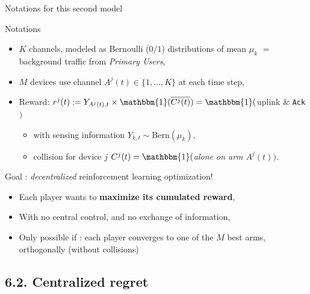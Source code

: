 \documentclass[12pt,english,ignorenonframetext,aspectratio=169,]{beamer}
\providecommand{\tightlist}{%
  \setlength{\itemsep}{0pt}\setlength{\parskip}{0pt}}
\begin{document}
\begin{frame}[fragile]{Notations for this second model}

\begin{block}{Notations}

\begin{itemize}
\tightlist
\item
  \(K\) channels, modeled as Bernoulli (\(0/1\)) distributions of mean
  \(\mu_k\) \(=\) background traffic from \emph{Primary Users},
\item
  \(M\) devices use channel \(A^j(t) \in \{1,\dots,K\}\) at each time
  step,
\item
  Reward:
  \(r^j(t) := Y_{A^j(t),t} \times \mathbbm{1}(\overline{C^j(t)}) = \mathbbm{1}(\)uplink
  \& \texttt{Ack}\()\)

  \begin{itemize}
  \tightlist
  \item
    with sensing information \(Y_{k,t} \sim \mathrm{Bern}(\mu_k)\),
  \item
    collision for device \(j\)
    \(C^j(t) = \mathbbm{1}(\)\emph{alone on arm $A^j(t)$}\()\).
  \end{itemize}
\end{itemize}

\pause

\end{block}

\begin{block}{Goal : \emph{decentralized} reinforcement learning
optimization!}

\begin{itemize}
\tightlist
\item
  Each player wants to \textbf{maximize its cumulated reward},
\item
  With no central control, and no exchange of information,
\item
  Only possible if : each player converges to one of the \(M\) best
  arms, orthogonally (without collisions)
\end{itemize}

\end{block}

\end{frame}



\subsection{\hfill{}6.2. Centralized regret\hfill{}}
\end{document}
